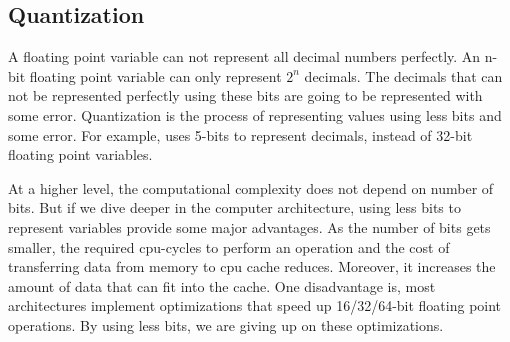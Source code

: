 \subsection{Quantization}
A floating point variable can not represent all decimal numbers perfectly. An n-bit floating point variable can only represent $2^{n}$ decimals. The decimals that can not be represented perfectly using these bits are going to be represented with some error. Quantization is the process of representing values using less bits and some error. For example, \cite{han2015deep} uses 5-bits to represent decimals, instead of 32-bit floating point variables. 

At a higher level, the computational complexity does not depend on number of bits. But if we dive deeper in the computer architecture, using less bits to represent variables provide some major advantages. As the number of bits gets smaller, the required cpu-cycles to perform an operation and the cost of transferring data from memory to cpu cache reduces. Moreover, it increases the amount of data that can fit into the cache. One disadvantage is, most architectures implement optimizations that speed up 16/32/64-bit floating point operations. By using less bits, we are giving up on these optimizations. 


